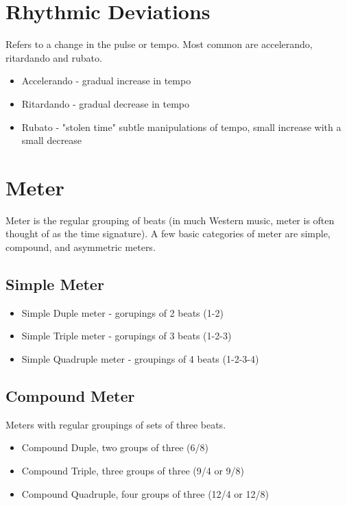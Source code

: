 \documentclass[12pt, a4paper]{report}
\begin{document}
  \section{Rhythmic Deviations}

  Refers to a change in the pulse or tempo. Most common are accelerando, ritardando and rubato.

  \begin{itemize}
    \item Accelerando - gradual increase in tempo
    \item Ritardando - gradual decrease in tempo
    \item Rubato - "stolen time" subtle manipulations of tempo, small increase with a small decrease
  \end{itemize}

  \section{Meter}

  Meter is the regular grouping of beats (in much Western music, meter is often thought of as the time signature). A few basic categories of meter are simple, compound, and asymmetric meters.

  \subsection{Simple Meter}

  \begin{itemize}
    \item Simple Duple meter - gorupings of 2 beats (1-2)
    \item Simple Triple meter - gorupings of 3 beats (1-2-3)
    \item Simple Quadruple meter - groupings of 4 beats (1-2-3-4)
  \end{itemize}

  \subsection{Compound Meter}

  Meters with regular groupings of sets of three beats.

  \begin{itemize}
    \item Compound Duple, two groups of three (6/8)
    \item Compound Triple, three groups of three (9/4 or 9/8)
    \item Compound Quadruple, four groups of three (12/4 or 12/8)
  \end{itemize}
\end{document}
